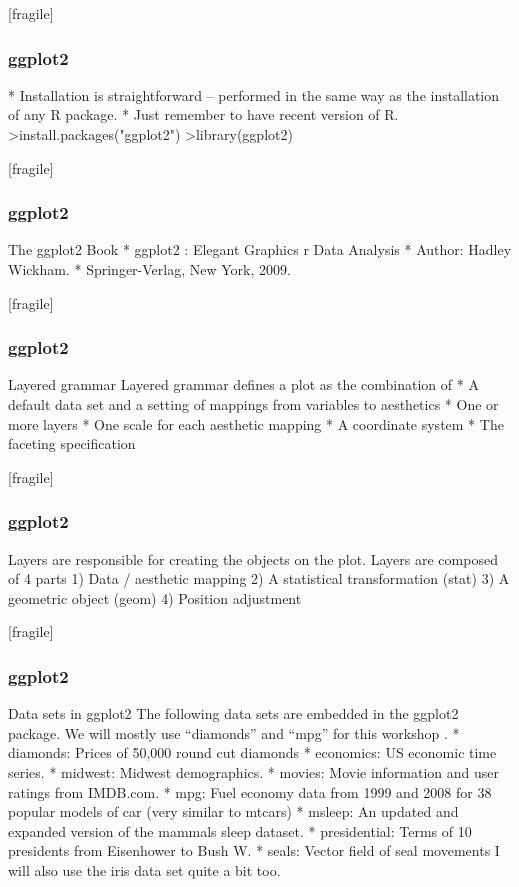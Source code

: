 [fragile]
\frametitle{ggplot2}
\largePreliminaries
* Installation is straightforward – performed in the same way as the installation of any R package.
* Just remember to have recent version of R. >install.packages("ggplot2") >library(ggplot2)

[fragile]
\frametitle{ggplot2}
\large The ggplot2 Book
* ggplot2 : Elegant Graphics r Data Analysis
* Author: Hadley Wickham.
* Springer-Verlag, New York, 2009.

[fragile]
\frametitle{ggplot2}
\large
Layered grammar
Layered grammar defines a plot as the combination of
* A default data set and a setting of mappings from variables to aesthetics
* One or more layers
* One scale for each aesthetic mapping
* A coordinate system
* The faceting specification

[fragile]
\frametitle{ggplot2}
\largeLayers
Layers are responsible for creating the objects on the plot. Layers are composed of 4 parts
1) Data / aesthetic mapping
2) A statistical transformation (stat)
3) A geometric object (geom)
4) Position adjustment

[fragile]
\frametitle{ggplot2}
\large
Data sets in ggplot2
The following data sets are embedded in the ggplot2 package. We will mostly use “diamonds” and “mpg” for this workshop .
* diamonds: Prices of 50,000 round cut diamonds
* economics: US economic time series.
* midwest: Midwest demographics.
* movies: Movie information and user ratings from IMDB.com.
* mpg: Fuel economy data from 1999 and 2008 for 38 popular models of car (very similar to mtcars)
* msleep: An updated and expanded version of the mammals sleep dataset.
* presidential: Terms of 10 presidents from Eisenhower to Bush W.
* seals: Vector field of seal movements
I will also use the iris data set quite a bit too.

